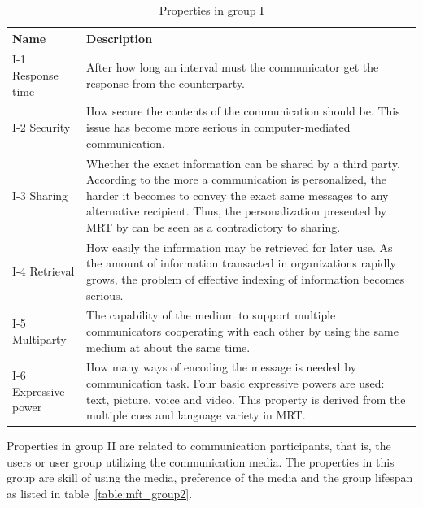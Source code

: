 \documentclass[english,12pt,a4paper,pdftex]{article}
\begin{document}
\begin{table}[!h]
\renewcommand{\arraystretch}{1.3}
\caption{Properties in group I}
\label{table:mft_group1}
\centering
\begin{tabular}{|p{4cm}|p{10cm}|}
\hline
\textbf{Name} & \textbf{Description}\\
\hline
I-1 Response time & After how long an interval must the communicator get the response from the counterparty. \\
\hline
I-2 Security & How secure the contents of the communication should be. This issue has become more serious in computer-mediated communication. \\
\hline
I-3 Sharing & Whether the exact information can be shared by a third party. According to \citet{higa2007} the more a communication is personalized, the harder it becomes to convey the exact same messages to any alternative recipient. Thus, the personalization presented by \ac{MRT} by \citet{daft1986} can be seen as a contradictory to sharing. \\
\hline
I-4 Retrieval & How easily the information may be retrieved for later use. As the amount of information transacted in organizations rapidly grows, the problem of effective indexing of information becomes serious. \\
\hline
I-5 Multiparty & The capability of the medium to support multiple communicators cooperating with each other by using the same medium at about the same time. \\
\hline
I-6 Expressive power & How many ways of encoding the message is needed by communication task. Four basic expressive powers are used: text, picture, voice and video. This property is derived from the multiple cues and language variety in \ac{MRT}. \\
\hline
\end{tabular}
\end{table}

Properties in group II are related to communication participants, that is, the users or user group utilizing the communication media. The properties in this group are skill of using the media, preference of the media and the group lifespan as listed in table~\ref{table:mft_group2}.
\end{document}
